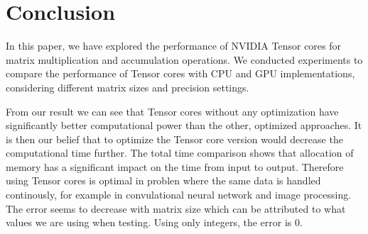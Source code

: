 \documentclass[conference]{IEEEtran}
\begin{document}
  \section{Conclusion}\label{sec:conclusion}
  
  In this paper, we have explored the performance of NVIDIA Tensor cores for matrix multiplication and accumulation operations. 
  We conducted experiments to compare the performance of Tensor cores with CPU and GPU implementations, 
  considering different matrix sizes and precision settings.

  From our result we can see that Tensor cores without any optimization have significantly better computational power
  than the other, optimized approaches. It is then our belief that to optimize the Tensor core version would 
  decrease the computational time further. The total time comparison shows that allocation of memory has a significant
  impact on the time from input to output. Therefore using Tensor cores is optimal in problen where the same data is
  handled continously, for example in convulational neural network and image processing. The error seems to decrease
  with matrix size which can be attributed to what values we are using when testing. Using only integers, the error is 0.

  



\end{document}
